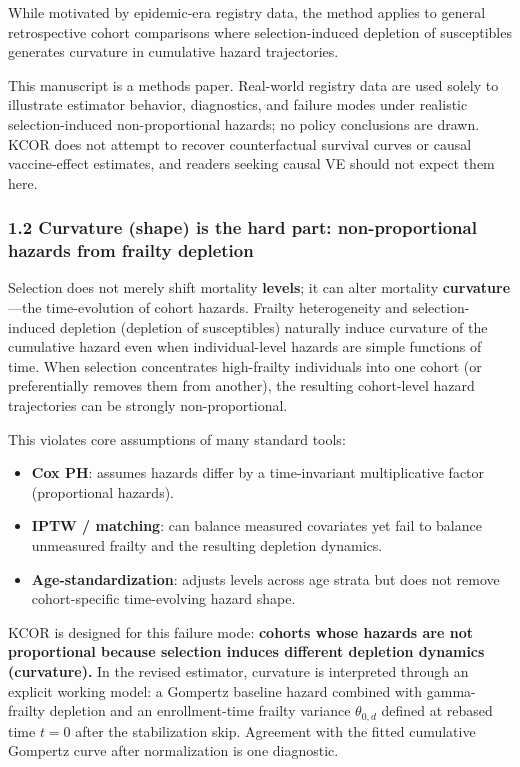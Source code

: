 \documentclass[
]{article}
\providecommand{\tightlist}{%
  \setlength{\itemsep}{0pt}\setlength{\parskip}{0pt}}
\begin{document}
While motivated by epidemic-era registry data, the method applies to general retrospective cohort comparisons where selection-induced depletion of susceptibles generates curvature in cumulative hazard trajectories.

This manuscript is a methods paper. Real-world registry data are used solely to illustrate estimator behavior, diagnostics, and failure modes under realistic selection-induced non-proportional hazards; no policy conclusions are drawn. KCOR does not attempt to recover counterfactual survival curves or causal vaccine-effect estimates, and readers seeking causal VE should not expect them here.

\subsubsection{1.2 Curvature (shape) is the hard part: non-proportional hazards from frailty depletion}\label{curvature-shape-is-the-hard-part-non-proportional-hazards-from-frailty-depletion}

Selection does not merely shift mortality \textbf{levels}; it can alter mortality \textbf{curvature}---the time-evolution of cohort hazards. Frailty heterogeneity and selection-induced depletion (depletion of susceptibles) naturally induce curvature of the cumulative hazard even when individual-level hazards are simple functions of time. When selection concentrates high-frailty individuals into one cohort (or preferentially removes them from another), the resulting cohort-level hazard trajectories can be strongly non-proportional.

This violates core assumptions of many standard tools:

\begin{itemize}
\tightlist
\item
  \textbf{Cox PH}: assumes hazards differ by a time-invariant multiplicative factor (proportional hazards).
\item
  \textbf{IPTW / matching}: can balance measured covariates yet fail to balance unmeasured frailty and the resulting depletion dynamics.
\item
  \textbf{Age-standardization}: adjusts levels across age strata but does not remove cohort-specific time-evolving hazard shape.
\end{itemize}

KCOR is designed for this failure mode: \textbf{cohorts whose hazards are not proportional because selection induces different depletion dynamics (curvature).} In the revised estimator, curvature is interpreted through an explicit working model: a Gompertz baseline hazard combined with gamma-frailty depletion and an enrollment-time frailty variance \(\theta_{0,d}\) defined at rebased time \(t=0\) after the stabilization skip. Agreement with the fitted cumulative Gompertz curve after normalization is one diagnostic.
\end{document}
